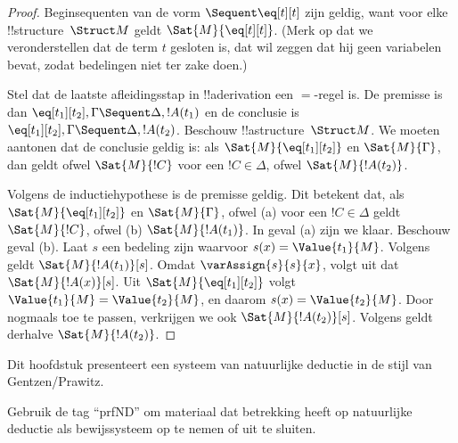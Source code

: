 \documentclass[openany]{memoir}
\begin{document}
\begin{proof}
Beginsequenten van de vorm ${} \Sequent \eq[t][t]$ zijn geldig, want
voor elke !!{structure}~$\Struct M$ geldt $\Sat{M}{\eq[t][t]}$. (Merk
op dat we veronderstellen dat de term $t$ gesloten is, dat wil zeggen
dat hij geen variabelen bevat, zodat bedelingen niet ter zake doen.)

Stel dat de laatste afleidingsstap in !!a{derivation} een $=$-regel is.
De premisse is dan $\eq[t_1][t_2], \Gamma \Sequent \Delta, !A(t_1)$
en de conclusie is $\eq[t_1][t_2], \Gamma \Sequent \Delta, !A(t_2)$.
Beschouw !!a{structure}~$\Struct M$. We moeten aantonen dat de conclusie
geldig is: als $\Sat{M}{\eq[t_1][t_2]}$ en $\Sat{M}{\Gamma}$, dan geldt
ofwel $\Sat{M}{!C}$ voor een $!C \in \Delta$, ofwel
$\Sat{M}{!A(t_2)}$.

Volgens de inductiehypothese is de premisse geldig. Dit betekent dat,
als $\Sat{M}{\eq[t_1][t_2]}$ en $\Sat{M}{\Gamma}$, ofwel (a) voor een
$!C \in \Delta$ geldt $\Sat{M}{!C}$, ofwel (b)
$\Sat{M}{!A(t_1)}$. In geval (a) zijn we klaar. Beschouw geval (b).
Laat $s$ een bedeling zijn waarvoor $s(x) = \Value{t_1}{M}$. Volgens
 geldt
$\Sat{M}{!A(t_1)}[s]$. Omdat $\varAssign{s}{s}{x}$, volgt uit
 dat $\Sat{M}{!A(x)}[s]$. Uit
$\Sat{M}{\eq[t_1][t_2]}$ volgt $\Value{t_1}{M} = \Value{t_2}{M}$, en
daarom $s(x) = \Value{t_2}{M}$. Door
 nogmaals toe te passen, verkrijgen
we ook $\Sat{M}{!A(t_2)}[s]$. Volgens
 geldt derhalve
$\Sat{M}{!A(t_2)}$.
\end{proof}
\endgroup
\OLEndChapterHook

\begingroup
\def\olfilename{OLP-0084}
\def\olfilepath{content/first-order-logic/natural-deduction/}
\hypertarget{unit-OLP-0084}{}



      {}
      {}

\begin{editorial}
Dit hoofdstuk presenteert een systeem van natuurlijke deductie in de
stijl van Gentzen/Prawitz.
  
Gebruik de tag ``prfND'' om materiaal dat betrekking heeft op
natuurlijke deductie als bewijssysteem op te nemen of uit te sluiten.
\end{editorial}
\end{document}
